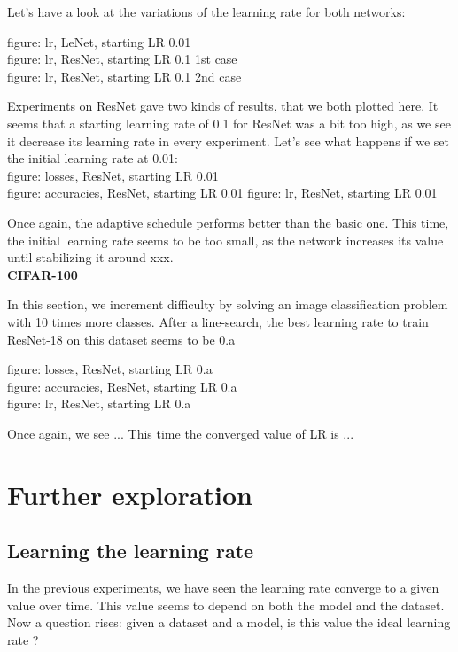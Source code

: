 \documentclass{article}
\begin{document}
  Let's have a look at the variations of the learning rate for both networks:
  
  figure: lr, LeNet, starting LR 0.01\\
  figure: lr, ResNet, starting LR 0.1 1st case\\
  figure: lr, ResNet, starting LR 0.1 2nd case
  
  Experiments on ResNet gave two kinds of results, that we both plotted here. It seems that a starting learning rate of 0.1 for ResNet was a bit too high, as we see it decrease its learning rate in every experiment. Let's see what happens if we set the initial learning rate at 0.01:\\
  
  figure: losses, ResNet, starting LR 0.01\\
  figure: accuracies, ResNet, starting LR 0.01
  figure: lr, ResNet, starting LR 0.01
  
  Once again, the adaptive schedule performs better than the basic one. This time, the initial learning rate seems to be too small, as the network increases its value until stabilizing it around xxx.\\
  
  \textbf{CIFAR-100}
  
  In this section, we increment difficulty by solving an image classification problem with 10 times more classes. After a line-search, the best learning rate to train ResNet-18 on this dataset seems to be 0.a

  figure: losses, ResNet, starting LR 0.a\\
  figure: accuracies, ResNet, starting LR 0.a\\
  figure: lr, ResNet, starting LR 0.a
  
  Once again, we see ... This time the converged value of LR is ...  
  
  \section{Further exploration}
  
  \subsection{Learning the learning rate}
  
  In the previous experiments, we have seen the learning rate converge to a given value over time. This value seems to depend on both the model and the dataset. Now a question rises: given a dataset and a model, is this value the ideal learning rate ?
  
\end{document}
